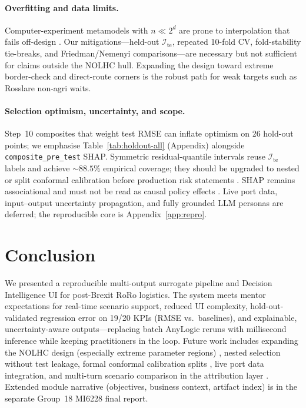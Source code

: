 \documentclass[10pt,twocolumn]{article}
\newcommand{\test}{\mathcal{I}_{\mathrm{te}}}
\begin{document}
\paragraph{Overfitting and data limits.}
Computer-experiment metamodels with $n{\ll}2^d$ are prone to interpolation that fails off-design \citep{vabalas2019,razavi2012,simpson2001}.
Our mitigations---held-out $\test$, repeated 10-fold CV, fold-stability tie-breaks, and Friedman/Nemenyi comparisons---are necessary but not sufficient for claims outside the NOLHC hull.
Expanding the design toward extreme border-check and direct-route corners \citep{viana2016} is the robust path for weak targets such as Rosslare non-agri waits.

\paragraph{Selection optimism, uncertainty, and scope.}
Step~10 composites that weight test RMSE can inflate optimism on 26 hold-out points; we emphasise Table~\ref{tab:holdout-all} (Appendix) alongside \texttt{composite\_pre\_test} SHAP.
Symmetric residual-quantile intervals reuse $\test$ labels and achieve ${\sim}88.5\%$ empirical coverage; they should be upgraded to nested or split conformal calibration before production risk statements \citep{angelopoulos2023conformal,romano2019cqr}.
SHAP remains associational and must not be read as causal policy effects \citep{lundberg2017shap,salih2023shap}.
Live port data, input--output uncertainty propagation, and fully grounded LLM personas are deferred; the reproducible core is Appendix~\ref{app:repro}.

\section{Conclusion}
\label{sec:conclusion}

We presented a reproducible multi-output surrogate pipeline and Decision Intelligence UI for post-Brexit RoRo logistics.
The system meets mentor expectations for real-time scenario support, reduced UI complexity, hold-out-validated regression error on 19/20 KPIs (RMSE vs.\ baselines), and explainable, uncertainty-aware outputs---replacing batch AnyLogic reruns with millisecond inference while keeping practitioners in the loop.
Future work includes expanding the NOLHC design (especially extreme parameter regions) \citep{viana2016}, nested selection without test leakage, formal conformal calibration splits \citep{angelopoulos2023conformal}, live port data integration, and multi-turn scenario comparison in the attribution layer \citep{monarch2021,laato2022}.
Extended module narrative (objectives, business context, artifact index) is in the separate Group~18 MI6228 final report.
\end{document}
